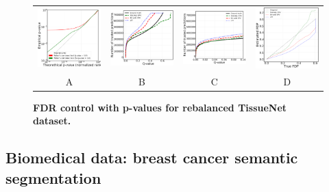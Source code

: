 \documentclass{article}
\begin{document}
\begin{figure}
	\centering
	\begin{tabular}{cccc}
 		\includegraphics[width=1.7in]{img/cnn_QQ_cells_balanced_TA_log.png} &
		\includegraphics[width=1.7in]{img/cnn_cells_balanced_TA_fdr_control.png} & 
            \includegraphics[width=1.7in]{img/cnn_cells_balanced_TA_fdr_control_loc.png} & 
            \includegraphics[width=1.7in]{img/cnn_FDPscat_cells_balanced_TA.png}
		\\	
		A & B & C & D
	\end{tabular}
	\caption{\bf FDR control with p-values for rebalanced TissueNet dataset.}
	\label{fig:pcam}
\end{figure}


\subsection{Biomedical data: breast cancer semantic segmentation}
\end{document}
